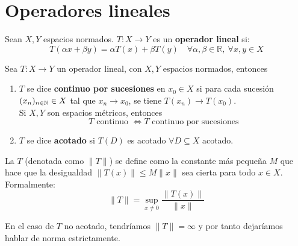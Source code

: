 \section{Operadores lineales}

\begin{definicion}
    Sean $X, Y$ espacios normados. $T: X \longrightarrow Y$ es un \textbf{operador lineal} si:
    \begin{equation*}
        T(\alpha x + \beta y) = \alpha T(x) + \beta T(y) \quad \forall \alpha, \beta \in \mathbb{R}, \ \forall x, y \in X
    \end{equation*}
\end{definicion}

\begin{definicion}
Sea $T: X \longrightarrow Y$ un operador lineal, con $X, Y$ espacios normados, entonces
    \begin{enumerate}
        \item[i)] $T$ se dice \textbf{continuo por sucesiones} en $x_0 \in X$ si para cada sucesión $(x_n)_{n\in \mathbb{N}} \in X$ tal que $x_n \longrightarrow x_0$, se tiene $T(x_n) \longrightarrow T(x_0)$. \\
        \noindent
        Si $X, Y$ son espacios métricos, entonces
        \begin{equation*}
            T \text{ continuo } \iff T \text{ continuo por sucesiones}
        \end{equation*}
        \item[iii)] $T$ se dice \textbf{acotado} si $T(D)$ es acotado $\forall D \subseteq X$ acotado.
    \end{enumerate}
\end{definicion}

\begin{definicion}
    La  $T$ (denotada como $\|T\|$) se define como la constante más pequeña $M$ que hace que la desigualdad $\|T(x)\| \leq M \|x\|$ sea cierta para todo $x\in X$. Formalmente:
    $$\|T\| = \sup_{x \neq 0} \frac{\|T(x)\|}{\|x\|}$$
\end{definicion}

\begin{observacion}
    En el caso de $T$ no acotado, tendríamos $\|T\|=\infty$ y por tanto dejaríamos hablar de norma estrictamente.
\end{observacion}

